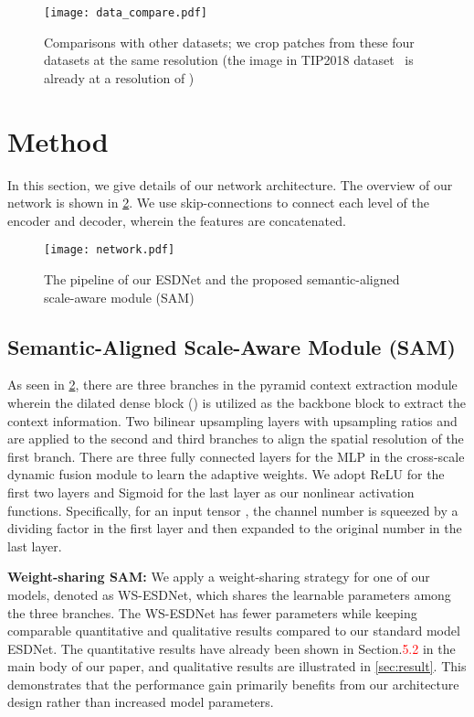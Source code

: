 \documentclass[runningheads]{llncs}
\begin{document}
\begin{figure}
   \begin{center}
      \texttt{[image: data\_compare.pdf]}
   \end{center}
      
      \caption{Comparisons with other datasets; we crop patches from these four datasets at the same resolution  (the image in TIP2018 dataset~\cite{sun2018moire} is already at a resolution of )}
      
   \label{fig:data_compare}
\end{figure}



\section{Method}\label{sec:supp-method}
In this section, we give details of our network architecture. The overview of our network is shown in \cref{fig:network}. We use skip-connections to connect each level of the encoder and decoder, wherein the features are concatenated. 

\begin{figure}
      \texttt{[image: network.pdf]}
      \caption{The pipeline of our ESDNet and the proposed semantic-aligned scale-aware module (SAM) 
      }
\label{fig:network}
\end{figure}

\subsection{Semantic-Aligned Scale-Aware Module (SAM)}
As seen in \cref{fig:network}, there are three branches in the pyramid context extraction module wherein the dilated dense block () is utilized as the backbone block to extract the context information. Two bilinear upsampling layers with upsampling ratios  and  are applied to the second and third branches to align the spatial resolution of the first branch. There are three fully connected layers for the MLP in the cross-scale dynamic fusion module to learn the adaptive weights. We adopt ReLU for the first two layers and Sigmoid for the last layer as our nonlinear activation functions. Specifically, for an input tensor , the channel number is squeezed by a dividing factor  in the first layer and then expanded to the original number in the last layer. 


\noindent\textbf{Weight-sharing SAM:}
We apply a weight-sharing strategy for one of our models, denoted as WS-ESDNet, which shares the learnable parameters among the three branches. The WS-ESDNet has fewer parameters while keeping comparable quantitative and qualitative results compared to our standard model ESDNet. The quantitative results have already been shown in Section.\textcolor{red}{5.2} in the main body of our paper, and qualitative results are illustrated in \cref{sec:result}. This demonstrates that the performance gain primarily benefits from our architecture design rather than increased model parameters.
\end{document}
